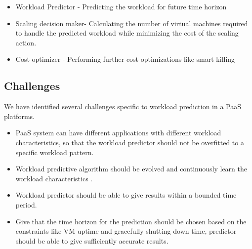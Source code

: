 \begin{itemize}
\item Workload Predictor - Predicting the workload for future time horizon
\end{itemize}

\begin{itemize}
\item Scaling decision maker- Calculating the number of virtual machines required to handle the predicted workload while minimizing the cost of the scaling action.
\end{itemize}

\begin{itemize}
\item Cost optimizer - Performing further cost optimizations like smart killing
\end{itemize}

\usepackage{multirow}


\subsection{Challenges}

We have identified several challenges specific to workload prediction in a PaaS platforms.
\begin{itemize}
\item PaaS system can have different applications with different workload characteristics, so that the workload predictor should not be overfitted to a specific workload pattern.
\end{itemize}
\begin{itemize}
\item Workload predictive algorithm should be evolved and continuously learn the workload characteristics . 
\end{itemize}
\begin{itemize}
\item Workload predictor should be able to give results within a bounded time period.
\end{itemize}
\begin{itemize}
\item Give that the  time horizon for the prediction should be chosen based on the constraints like VM uptime and gracefully shutting down time, predictor should be able to give sufficiently accurate results.
\end{itemize}


